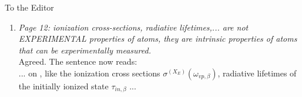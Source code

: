 \documentclass[DIN,pagenumber=false,parskip=half,fromalign=left,fromphone=true,fromemail=true,fromurl=false,fromlogo=false,fromrule=false]{scrlttr2}
\begin{document}
\begin{letter}{To the Editor}
\begin{enumerate}
{{For the ETMD(3) the approximation reads}}
%
\begin{align}                                                  
 \Gamma_{{\rm ETMD},j,\beta} =& \frac{c}{\pi} \sum\limits_{m,M_{in,D'}}      
                        \frac{\Theta_{m,k}(\alpha_j) \sigma^{(X_E)}(\omega_{vp,\beta})
                              \left| <\tilde{D}_{m,j,\beta}(M_{in,D'})>\right|^2}
                         {R_j^6 \omega_{vp,\beta}}\\           
               =& \frac{c}{\pi R_j^6}                          
               \sum\limits_{M_{in,D'}}                         
               \left( \left| <\tilde{D}_{x,j,\beta} (M_{in,D'}) > \right|^2  
                 (2+ \sin^2\alpha_j)                           
               + \left| <\tilde{D}_{z,j,\beta} (M_{in,D'}) > \right|^2       
                 (1+\cos^2\alpha_j) \right) \nonumber \\       
           & \times\, \frac{c\sigma^{(X_E)}(\omega_{vp,\beta})}{\omega_{vp,\beta}}
\end{align}                                                    
%                                                              
{}
$\Theta_{m}(\alpha_j)$ is a function depending on the angle $\alpha_j$       
of the triple and the direction of the dipole                  
transition moment $m$ ...

  \item \emph{Page 12:
        ionization cross-sections, radiative lifetimes,... are not EXPERIMENTAL properties of atoms, they are intrinsic properties of atoms that can be experimentally measured.}\\
        Agreed. The sentence now reads:\\
        ... on {\color{blue}{intrinsic atomic properties
        which can be determined experimentally}}, like the ionization
        cross sections
        $\sigma^{(X_E)}(\omega_{vp,\beta})$, radiative lifetimes of the initially
        ionized state $\tau_{in,\beta}$ ...
 

\end{enumerate}
\end{letter}
\end{document}
